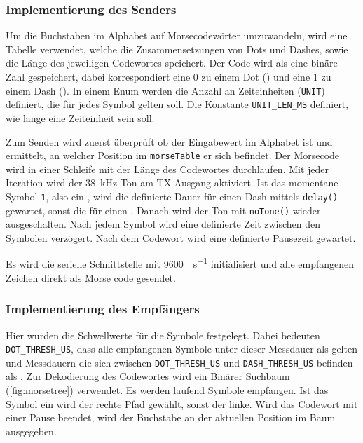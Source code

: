 \newpage
\subsubsection{Implementierung des Senders}

Um die Buchstaben im Alphabet auf Morsecodewörter umzuwandeln, wird eine Tabelle verwendet, welche die Zusammensetzungen von Dots und Dashes, sowie die Länge des jeweiligen Codewortes speichert. Der Code wird als eine binäre Zahl gespeichert, dabei korrespondiert eine 0 zu einem Dot (\mdot) und eine 1 zu einem Dash (\mdash). In einem Enum werden die Anzahl an Zeiteinheiten (\lstinline!UNIT!) definiert, die für jedes Symbol gelten soll. Die Konstante \lstinline!UNIT_LEN_MS! definiert, wie lange eine Zeiteinheit sein soll.



\newpage
Zum Senden wird zuerst überprüft ob der Eingabewert im Alphabet ist und ermittelt, an welcher Position im \lstinline!morseTable! er sich befindet. Der Morsecode wird in einer Schleife mit der Länge des Codewortes durchlaufen. Mit jeder Iteration wird der \SI{38}{\kilo\hertz} Ton am TX-Ausgang aktiviert. Ist das momentane Symbol \lstinline!1!, also ein \mdash, wird die definierte Dauer für einen Dash mittels \lstinline!delay()! gewartet, sonst die für einen \mdot. Danach wird der Ton mit \lstinline!noTone()! wieder ausgeschalten. Nach jedem Symbol wird eine definierte Zeit zwischen den Symbolen verzögert. Nach dem Codewort wird eine definierte Pausezeit gewartet.



Es wird die serielle Schnittstelle mit \SI{9600}{\bit\per\second} initialisiert und alle empfangenen Zeichen direkt als Morse code gesendet.



\newpage
\subsubsection{Implementierung des Empfängers}

Hier wurden die Schwellwerte für die Symbole festgelegt. Dabei bedeuten \lstinline!DOT_THRESH_US!, dass alle empfangenen Symbole unter dieser Messdauer als \mdot gelten und Messdauern die sich zwischen \lstinline!DOT_THRESH_US! und \lstinline!DASH_THRESH_US! befinden als \mdash. Zur Dekodierung des Codewortes wird ein Binärer Suchbaum (\autoref{fig:morsetree}) verwendet. Es werden laufend Symbole empfangen. Ist das Symbol ein \mdot wird der rechte Pfad gewählt, sonst der linke. Wird das Codewort mit einer Pause beendet, wird der Buchstabe an der aktuellen Position im Baum ausgegeben.

